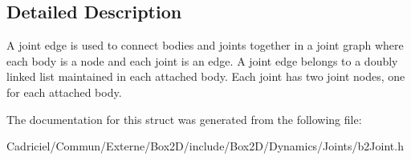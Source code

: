 \subsection{Detailed Description}
A joint edge is used to connect bodies and joints together in a joint graph where each body is a node and each joint is an edge. A joint edge belongs to a doubly linked list maintained in each attached body. Each joint has two joint nodes, one for each attached body. 

The documentation for this struct was generated from the following file\+:\begin{DoxyCompactItemize}
\item 
Cadriciel/\+Commun/\+Externe/\+Box2\+D/include/\+Box2\+D/\+Dynamics/\+Joints/b2\+Joint.\+h\end{DoxyCompactItemize}
